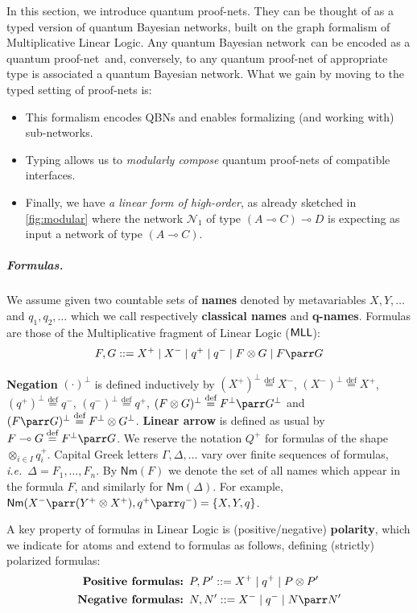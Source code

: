 \documentclass[10pt,a4paper]{article}
\newcommand*{\ie}{\emph{i.e.}\xspace}
\newcommand{\textdef}[1]{\textbf{#1}}
\newcommand*{\defeq}{\stackrel{\text{def}}{=}}
\newcommand*{\orth}{^\perp}
\newcommand*{\lollipop}{\multimap}
\newcommand{\FormA}{F} %
\newcommand{\FormB}{G} %
\newcommand{\MLL}{\ensuremath{\mathsf{MLL}}\xspace}
\newcommand{\Nm}[1]{\mathsf{Nm}(#1)}
\newcommand*{\logsys}[1]{\textnormal{\textsf{#1}}}
\renewcommand*{\MLL}{\ensuremath{\logsys{MLL}}\xspace}
\newcommand{\netN}{\mathcal N}
\newcommand{\N}{\netN}
\newcommand{\reg}{Q}
\newcommand{\qreg}{\reg}
\newcommand*{\QBN}{quantum Bayesian network}
\newcommand*{\qqbn}{\textsf{QBN}}
\newcommand*{\qpn}{quantum proof-net\xspace}
\newcommand*{\qpns}{quantum proof-nets\xspace}
\begin{document}
In this section, we introduce \qpns.
They can be thought of as a typed version of \QBN s, built on the graph formalism of Multiplicative Linear Logic.
Any \QBN\ can be encoded as a \qpn\ and, conversely, to any \qpn of appropriate type is associated a \QBN.
What we gain by moving to the typed setting of proof-nets is:
\begin{itemize}
\item 
This formalism encodes \qqbn s and enables formalizing (and working with) sub-networks.
\item
Typing allows us to \emph{modularly compose} \qpns of compatible interfaces.
\item
Finally, we have \emph{a linear form of high-order}, as already sketched in \cref{fig:modular} where the network $\N_1$ of type $(A\lollipop C) \lollipop D$ is expecting as input a network of type $(A\lollipop C)$.
\end{itemize}

\subparagraph{Formulas.}

We assume given two countable sets of \textdef{names} denoted by metavariables $X, Y, \dots$ and $q_1, q_2, \dots$ which we call respectively \textdef{classical names} and \textdef{q-names}.
Formulas are those of the Multiplicative fragment of Linear Logic (\MLL):
\begin{equation*}
	\FormA,\FormB ::=
	X^+	\mid X^- \mid q^+ \mid q^-
	\mid\FormA\otimes\FormB
	\mid\FormA\parr\FormB
\end{equation*}

\textdef{Negation} $(\cdot)\orth$ is defined inductively by
$(X^+)\orth\defeq X^-$,
$(X^-)\orth\defeq X^+$, 
$(q^+)\orth \defeq q^-$,
$(q^-)\orth \defeq {q^+}$,
$(\FormA\otimes\FormB)\orth \defeq\FormA\orth\parr\FormB\orth$ and
$(\FormA\parr\FormB)\orth \defeq\FormA\orth\otimes\FormB\orth$.
\textdef{Linear arrow} is defined as usual by $F\lollipop G \defeq F^\bot \parr G$. 
We reserve the notation $\qreg^+$ for formulas of the shape $\otimes_{i\in I} q_i^+$.
Capital Greek letters $\Gamma,\Delta,\dots$ vary over finite sequences of formulas, \ie\ $\Delta = \FormA_1,\dots, \FormA_n$.
By $\Nm F$ we denote the set of all names which appear in the formula $F$, and similarly for $\Nm \Delta$.
For example, $\Nm{X^-\parr (Y^+\otimes X^+), q^+\parr q^-} =\{X,Y,q\}$.

A key property of formulas in Linear Logic is (positive/negative) \textdef{polarity}, which we indicate for atoms and extend to formulas as follows, defining (strictly) polarized formulas:
\begin{align*}
\textbf{Positive formulas: }& P, P'::= X^+ \mid q^+ \mid P \otimes P'
\\
\textbf{Negative formulas: }& N, N'::= X^- \mid q^- \mid N \parr N'
\end{align*}
\end{document}
